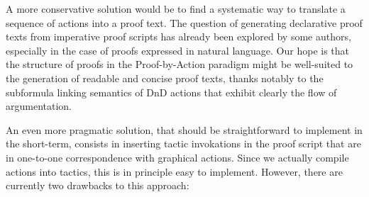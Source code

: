 A more conservative solution would be to find a systematic way to translate a
sequence of actions into a proof text. The question of generating declarative
proof texts from imperative proof scripts has already been explored by some
authors, especially in the case of proofs expressed in natural
language. Our hope is that the structure of proofs
in the Proof-by-Action paradigm might be well-suited to the generation of
readable and concise proof texts, thanks notably to the subformula linking
semantics of DnD actions that exhibit clearly the flow of argumentation.

An even more pragmatic solution, that should be straightforward to implement in
the short-term, consists in inserting tactic invokations in the proof script
that are in one-to-one correspondence with graphical actions. Since we actually
compile actions into tactics, this is in principle easy to implement. However,
there are currently two drawbacks to this approach:

